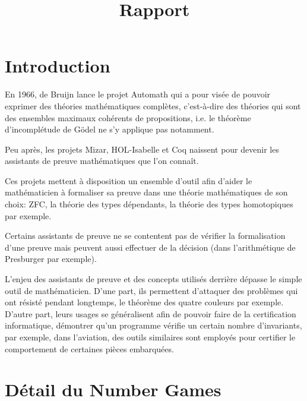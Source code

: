 \documentclass[
]{article}
\title{Rapport}
\date{}
\begin{document}
\maketitle

\section{Introduction}

En 1966, de Bruijn lance le projet Automath qui a pour visée de pouvoir exprimer des théories mathématiques complètes, c'est-à-dire des théories qui sont des ensembles maximaux cohérents de propositions, i.e. le théorème d'incomplétude de Gödel ne s'y applique pas notamment.

Peu après, les projets Mizar, HOL-Isabelle et Coq naissent pour devenir les assistants de preuve mathématiques que l'on connaît.

Ces projets mettent à disposition un ensemble d'outil afin d'aider le mathématicien à formaliser sa preuve dans une théorie mathématiques de son choix: ZFC, la théorie des types dépendants, la théorie des types homotopiques par exemple.

Certains assistants de preuve ne se contentent pas de vérifier la formalisation d'une preuve mais peuvent aussi effectuer de la décision (dans l'arithmétique de Presburger par exemple).

L'enjeu des assistants de preuve et des concepts utilisés derrière dépasse le simple outil de mathématicien.
D'une part, ils permettent d'attaquer des problèmes qui ont résisté pendant longtemps, le théorème des quatre couleurs par exemple.
D'autre part, leurs usages se généralisent afin de pouvoir faire de la certification informatique, démontrer qu'un programme vérifie un certain nombre d'invariants, par exemple, dans l'aviation, des outils similaires sont employés pour certifier le comportement de certaines pièces embarquées.

\section{Détail du Number Games}
\end{document}
